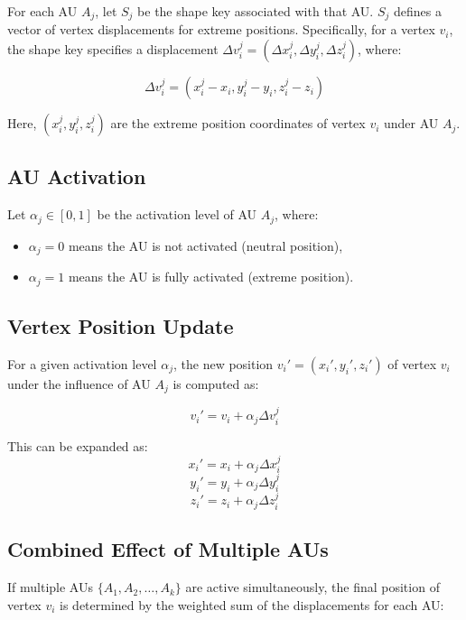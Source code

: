 \documentclass[../../main]{subfiles}
\begin{document}
For each AU \( A_j \), let \( S_j \) be the shape key associated with that AU. \( S_j \) defines a vector of vertex displacements for extreme positions. Specifically, for a vertex \( v_i \), the shape key specifies a displacement \( \Delta v_i^j = (\Delta x_i^j, \Delta y_i^j, \Delta z_i^j) \), where:

\[
\Delta v_i^j = (x_i^j - x_i, y_i^j - y_i, z_i^j - z_i)
\]

Here, \( (x_i^j, y_i^j, z_i^j) \) are the extreme position coordinates of vertex \( v_i \) under AU \( A_j \).

\subsection{AU Activation}
\label{ch:facial_expressions:blendshape_creation:au_activation}

Let \( \alpha_j \in [0, 1] \) be the activation level of AU \( A_j \), where:
\begin{itemize}
    \item \( \alpha_j = 0 \) means the AU is not activated (neutral position),
    \item \( \alpha_j = 1 \) means the AU is fully activated (extreme position).
\end{itemize}

\subsection{Vertex Position Update}
\label{ch:facial_expressions:blendshape_creation:vertex_position_update}

For a given activation level \( \alpha_j \), the new position \( v_i' = (x_i', y_i', z_i') \) of vertex \( v_i \) under the influence of AU \( A_j \) is computed as:

\[
v_i' = v_i + \alpha_j \Delta v_i^j
\]

This can be expanded as:
\[
x_i' = x_i + \alpha_j \Delta x_i^j
\]
\[
y_i' = y_i + \alpha_j \Delta y_i^j
\]
\[
z_i' = z_i + \alpha_j \Delta z_i^j
\]

\subsection{Combined Effect of Multiple AUs}
\label{ch:facial_expressions:blendshape_creation:combined_effect_of_multiple_aus}

If multiple AUs \( \{ A_1, A_2, \dots, A_k \} \) are active simultaneously, the final position of vertex \( v_i \) is determined by the weighted sum of the displacements for each AU:
\end{document}
